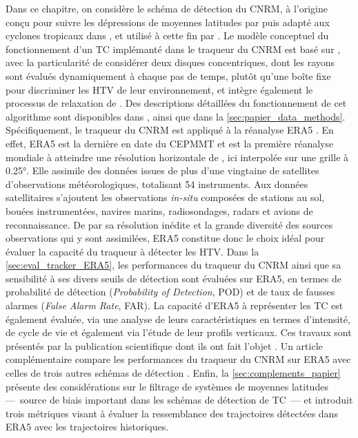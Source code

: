 \documentclass[../main.tex]{subfiles}
\begin{document}
Dans ce chapitre, on considère le schéma de détection du CNRM, à l'origine conçu pour suivre les dépressions de moyennes latitudes par
\textcite{ayrault_nouvelle_2000} puis adapté aux cyclones tropicaux dans \textcite{chauvin_response_2006}, et utilisé à cette fin par
\textcite{daloz_impact_2012,chauvin_atlantic_2017,chauvin_future_2020,cattiaux_projected_2020}. Le modèle conceptuel du fonctionnement d'un TC implémanté dans le
traqueur du CNRM est basé sur \textcite{bengtsson_hurricanetype_1995}, avec la particularité de considérer deux disques concentriques, dont les rayons sont évalués
dynamiquement à chaque pas de temps, plutôt qu'une boîte fixe pour discriminer les HTV de leur environnement, et intègre également le processus de relaxation de
\textcite{camargo_improving_2002}. Des descriptions détaillées du fonctionnement de cet algorithme sont disponibles dans \textcite{chauvin_response_2006}, ainsi que
dans la \cref{sec:papier_data_methods}. Spécifiquement, le traqueur du CNRM est appliqué à la réanalyse ERA5 \parencite{hersbach_era5_2020}. En effet, ERA5 est
la dernière en date du CEPMMT et est la première réanalyse mondiale à atteindre une résolution horizontale de , ici interpolée sur une grille à
\ang{0.25}. Elle assimile des données issues de plus d'une vingtaine de satellites d'observations météorologiques, totalisant \num{54} instruments. Aux données
satellitaires s'ajoutent les observations \textit{in-situ} composées de stations au sol, bouées instrumentées, navires marins, radiosondages, radars et avions
de reconnaissance. De par sa résolution inédite et la grande diversité des sources observations qui y sont assimilées, ERA5 constitue donc le choix idéal pour
évaluer la capacité du traqueur à détecter les HTV. Dans la \cref{sec:eval_tracker_ERA5}, les performances du traqueur du CNRM ainsi que sa sensibilité à ses
divers seuils de détection sont évaluées sur ERA5, en termes de probabilité de détection (\textit{Probability of Detection}, POD) et de taux de fausses alarmes
(\textit{False Alarm Rate}, FAR). La capacité d'ERA5 à représenter les TC est également évaluée, via une analyse de leurs caractéristiques en termes
d'intensité, de cycle de vie et également via l'étude de leur profils verticaux. Ces travaux sont présentés par la publication scientifique dont ils ont fait
l'objet \parencite{dulac_assessing_2023}. Un article complémentaire compare les performances du traqueur du CNRM sur ERA5 avec celles de trois autres schémas de
détection \parencite{bourdin_intercomparison_2022}. Enfin, la \cref{sec:complements_papier} présente des considérations sur le filtrage de systèmes de moyennes
latitudes ---~source de biais important dans les schémas de détection de TC~--- et introduit trois métriques visant à évaluer la ressemblance des trajectoires
détectées dans ERA5 avec les trajectoires historiques.
\end{document}
